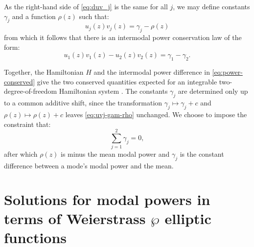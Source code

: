 \documentclass[11pt,a4paper]{article}
\numberwithin{equation}{section}
\begin{document}
As the right-hand side of \eqref{eq:duv_j} is the same for all $j$, 
we may define constants $\gamma_j$ and a function $\rho(z)$ such that:
\begin{equation}
\label{eq:uvj-gam-rho}
u_j(z) v_j(z) = \gamma_j - \rho(z)
\end{equation}
from which it follows that there is an intermodal power conservation law of the form:
\begin{equation}
\label{eq:power-conserved}
u_1(z) v_1(z) - u_2(z) v_2(z) = \gamma_1 - \gamma_2.
\end{equation}

Together, the Hamiltonian $H$ and the intermodal power difference in \eqref{eq:power-conserved} give the two conserved quantities expected for an integrable two-degree-of-freedom Hamiltonian system \cite{arnoldMathematicalMethodsClassical1989}.
The constants $\gamma_j$ are determined only up to a common additive shift, since the transformation $\gamma_j\mapsto\gamma_j+c$ and $\rho(z)\mapsto\rho(z)+c$ leaves \eqref{eq:uvj-gam-rho} unchanged.
We choose to impose the constraint that:
\begin{equation}
\sum\limits_{j=1}^{2}\gamma_j = 0,
\end{equation} 
after which $\rho(z)$ is minus the mean modal power and $\gamma_j$ is the constant difference between a mode's modal power and the mean.



\section{Solutions for modal powers in terms of Weierstrass \texorpdfstring{$\wp$}{wp} elliptic functions}\label{sec:mode-power}
\end{document}
